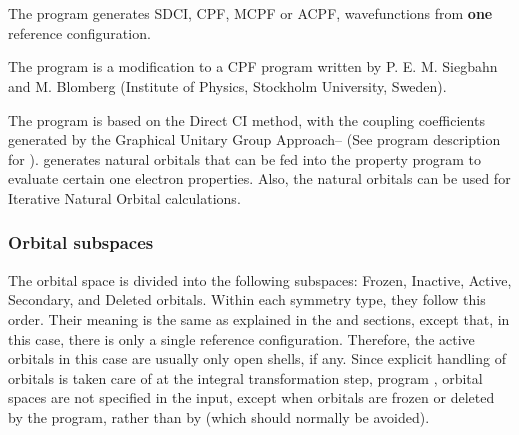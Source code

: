 
\section{}
\label{UG:sec:cpf}

The
 program generates SDCI,
CPF\cite{Ahlrichs:85},
MCPF\cite{Chong:86} or
ACPF\cite{Gdanitz:88},
wavefunctions from {\bf one} reference configuration.

The
 program is a modification to a CPF
program written by P. E. M. Siegbahn and M. Blomberg
(Institute of Physics, Stockholm University, Sweden).

The program is based on the Direct CI method\cite{Roos:72},
with the coupling coefficients generated
by the Graphical Unitary Group Approach{\cite{Shavitt:77}--\cite{Siegbahn:80}}
(See program description for
).
 generates natural orbitals that can be fed into
the property program to evaluate certain one electron properties.
Also, the natural orbitals can be used for Iterative Natural Orbital
calculations.

\subsubsection{Orbital subspaces}

The orbital space is divided into the following subspaces:
Frozen,
Inactive, Active, Secondary, and Deleted orbitals. Within each
symmetry type, they follow this order.
Their meaning is the same as explained in the  and
 sections, except that, in this case, there is only
a single reference configuration. Therefore, the active orbitals in
this case are usually only open shells, if any.
Since explicit handling of orbitals is taken care of at the integral
transformation step, program , orbital spaces are not
specified in the input, except when orbitals are frozen or deleted by the
 program, rather than by 
(which should normally be avoided).

